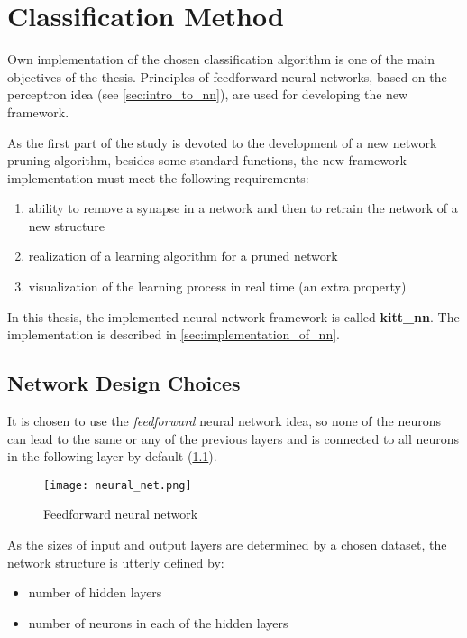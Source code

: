 \chapter{Classification Method} \label{chap:kitt_nn}
Own implementation of the chosen classification algorithm is one of the main objectives of the thesis. Principles of feedforward neural networks, based on the perceptron idea (see \cref{sec:intro_to_nn}), are used for developing the new framework.

As the first part of the study is devoted to the development of a new network pruning algorithm, besides some standard functions, the new framework implementation must meet the following requirements:

\begin{enumerate}
\item ability to remove a synapse in a network and then to retrain the network of a new structure
\item realization of a learning algorithm for a pruned network
\item visualization of the learning process in real time (an extra property)
\end{enumerate}

In this thesis, the implemented neural network framework is called \textbf{kitt\_nn}. The implementation is described in \cref{sec:implementation_of_nn}.

\section{Network Design Choices} \label{sec:network_design_choices}
It is chosen to use the \textit{feedforward} neural network idea, so none of the neurons can lead to the same or any of the previous layers and is connected to all neurons in the following layer by default (\cref{img:neural_net}).

\begin{figure}[H]
  \centering
  \texttt{[image: neural\_net.png]}
  \caption{Feedforward neural network}
  \label{img:neural_net}
\end{figure}

As the sizes of input and output layers are determined by a chosen dataset, the network structure is utterly defined by:
\begin{itemize}
\item number of hidden layers
\item number of neurons in each of the hidden layers
\end{itemize}


